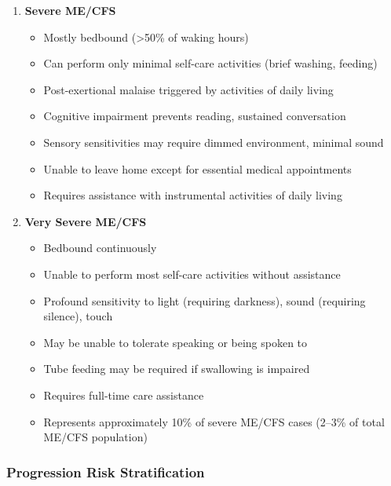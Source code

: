 \begin{enumerate}
    \item \textbf{Severe ME/CFS}
    \begin{itemize}
        \item Mostly bedbound (>50\% of waking hours)
        \item Can perform only minimal self-care activities (brief washing, feeding)
        \item Post-exertional malaise triggered by activities of daily living
        \item Cognitive impairment prevents reading, sustained conversation
        \item Sensory sensitivities may require dimmed environment, minimal sound
        \item Unable to leave home except for essential medical appointments
        \item Requires assistance with instrumental activities of daily living
    \end{itemize}

    \item \textbf{Very Severe ME/CFS}
    \begin{itemize}
        \item Bedbound continuously
        \item Unable to perform most self-care activities without assistance
        \item Profound sensitivity to light (requiring darkness), sound (requiring silence), touch
        \item May be unable to tolerate speaking or being spoken to
        \item Tube feeding may be required if swallowing is impaired
        \item Requires full-time care assistance
        \item Represents approximately 10\% of severe ME/CFS cases (2--3\% of total ME/CFS population)
    \end{itemize}
\end{enumerate}

\subsubsection{Progression Risk Stratification}

